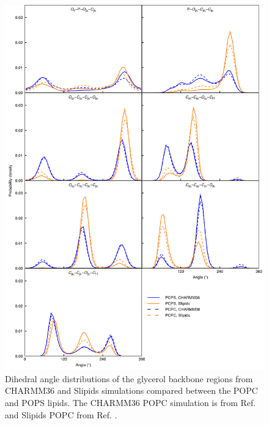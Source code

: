 \documentclass[journal=jpcbfk]{achemso}
\begin{document}
\begin{figure}[]
  \centering
  \includegraphics[width=15.0cm]{../Figs/figS10.png}
  \caption{\label{dihedralsGLYpc}
    Dihedral angle distributions of the glycerol backbone regions from CHARMM36 and Slipids simulations
    compared between the POPC and POPS lipids.
    The CHARMM36 POPC simulation is from Ref.  and Slipids POPC from Ref. .
  }
\end{figure}
\end{document}
